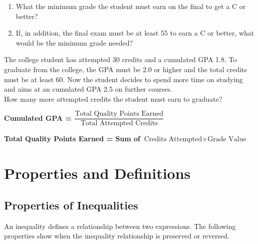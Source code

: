 \documentclass[en,12pt]{elegantbook}
\providecommand{\tightlist}{%
  \setlength{\itemsep}{0pt}\setlength{\parskip}{0pt}}
\begin{document}
\begin{enumerate}
\def\labelenumi{\arabic{enumi}.}
\tightlist
\item
  What the minimum grade the student must earn on the final to get a C or better?
\item
  If, in addition, the final exam must be at least 55 to earn a C or better, what would be the minimum grade needed?
\end{enumerate}

\begin{rmdthink}
The college student has attempted 30 credits and a cumulated GPA 1.8. To
graduate from the college, the GPA must be 2.0 or higher and the total
credits must be at least 60. Now the student decides to spend more time
on studying and aims at an cumulated GPA 2.5 on further courses.\\
How many more attempted credits the student must earn to graduate?

\textbf{Cumulated GPA =
\(\dfrac{\text{Total Quality Points Earned}}{\text{Total Attempted Credits}}\)}

\textbf{Total Quality Points Earned = Sum of
\(\text{Credits Attempted}\times \text{Grade Value}\)}
\end{rmdthink}

\hypertarget{properties-and-definitions}{%
\section{Properties and Definitions}\label{properties-and-definitions}}

\hypertarget{properties-of-inequalities}{%
\subsection*{Properties of Inequalities}\label{properties-of-inequalities}}

An inequality defines a relationship between two expressions. The following properties show when the inequality relationship is preserved or reversed.
\end{document}
